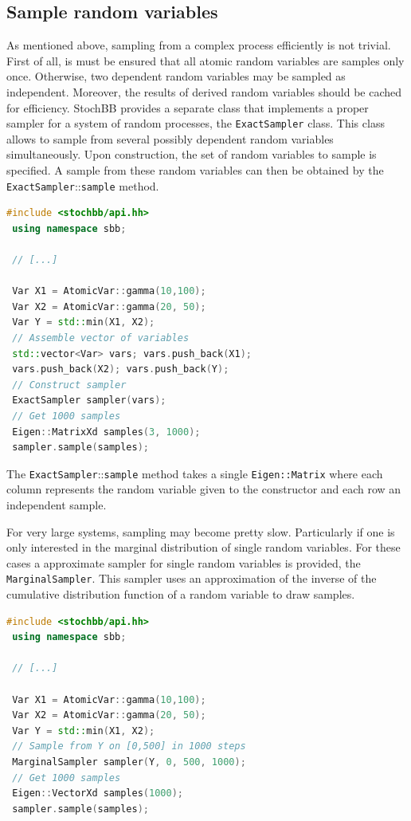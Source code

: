 \documentclass[a4paper, 10pt]{paper}
\newcommand{\code}[1]{\texttt{#1}}
\newcommand{\class}[1]{\code{#1}}
\newcommand{\method}[2]{\code{#1}::\code{#2}}
\begin{document}
\subsection{Sample random variables}
As mentioned above, sampling from a complex process efficiently is not trivial. First of all, is
must be ensured that all atomic random variables are samples only once. Otherwise, two dependent
random variables may be sampled as independent. Moreover, the results of derived random variables
should be cached for efficiency. StochBB provides a separate class that implements a proper
sampler for a system of random processes, the \class{ExactSampler} class. This class allows to
sample from several possibly dependent random variables simultaneously. Upon construction, the
set of random variables to sample is specified. A sample from these random variables can then be
obtained by the \method{ExactSampler}{sample} method.
\begin{lstlisting}[language=C++]
 #include <stochbb/api.hh>
 using namespace sbb;

 // [...]

 Var X1 = AtomicVar::gamma(10,100);
 Var X2 = AtomicVar::gamma(20, 50);
 Var Y = std::min(X1, X2);
 // Assemble vector of variables
 std::vector<Var> vars; vars.push_back(X1); 
 vars.push_back(X2); vars.push_back(Y);
 // Construct sampler
 ExactSampler sampler(vars);
 // Get 1000 samples
 Eigen::MatrixXd samples(3, 1000);
 sampler.sample(samples);
\end{lstlisting}

The \method{ExactSampler}{sample} method takes a single \class{Eigen::Matrix} where each column
represents the random variable given to the constructor and each row an independent sample.

For very large systems, sampling may become pretty slow. Particularly if one is only interested
in the marginal distribution of single random variables. For these cases a approximate sampler
for single random variables is provided, the \class{MarginalSampler}. This sampler uses an
approximation of the inverse of the cumulative distribution function of a random variable
to draw samples.
\begin{lstlisting}[language=C++]
 #include <stochbb/api.hh>
 using namespace sbb;

 // [...]

 Var X1 = AtomicVar::gamma(10,100);
 Var X2 = AtomicVar::gamma(20, 50);
 Var Y = std::min(X1, X2);
 // Sample from Y on [0,500] in 1000 steps
 MarginalSampler sampler(Y, 0, 500, 1000);
 // Get 1000 samples
 Eigen::VectorXd samples(1000);
 sampler.sample(samples);
\end{lstlisting}
\end{document}
